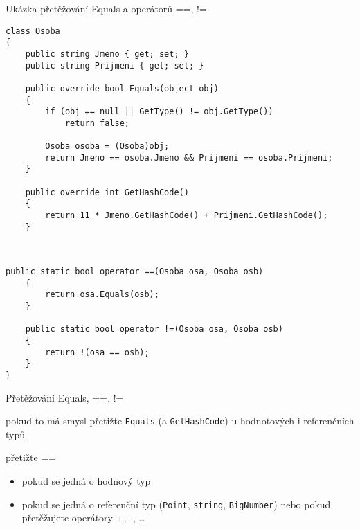 \begin{frame}[fragile]
\begin{bonusblock}{Ukázka přetěžování Equals a operátorů ==, !=}
\begin{lstlisting}[basicstyle=\small]
class Osoba
{
	public string Jmeno { get; set; }
	public string Prijmeni { get; set; }
	
	public override bool Equals(object obj)
	{
	    if (obj == null || GetType() != obj.GetType())
	        return false;
	
	    Osoba osoba = (Osoba)obj;
	    return Jmeno == osoba.Jmeno && Prijmeni == osoba.Prijmeni;
	}
	
	public override int GetHashCode()
	{
		return 11 * Jmeno.GetHashCode() + Prijmeni.GetHashCode();
	}
\end{lstlisting}
\end{bonusblock}
\end{frame}


\begin{frame}[fragile]
\vfill
\begin{bonusblock}{~}
\begin{lstlisting}[basicstyle=\small]
	public static bool operator ==(Osoba osa, Osoba osb)
	{
	    return osa.Equals(osb);
	}
	
	public static bool operator !=(Osoba osa, Osoba osb)
	{
	    return !(osa == osb);
	}
}
\end{lstlisting}
\end{bonusblock}
\vfill
\begin{bitemize}{Přetěžování Equals, ==, !=}
\item pokud to má smysl přetižte \lstinline|Equals| (a \lstinline|GetHashCode|) u hodnotových i referenčních typů
\item přetižte ==
\begin{itemize}
\item pokud se jedná o hodnový typ
\item pokud se jedná o referenční  typ (\lstinline|Point|, \lstinline|string|, \lstinline|BigNumber|) nebo pokud přetěžujete operátory +, -, \ldots
\end{itemize}
\end{bitemize}
\vfill
\end{frame}







